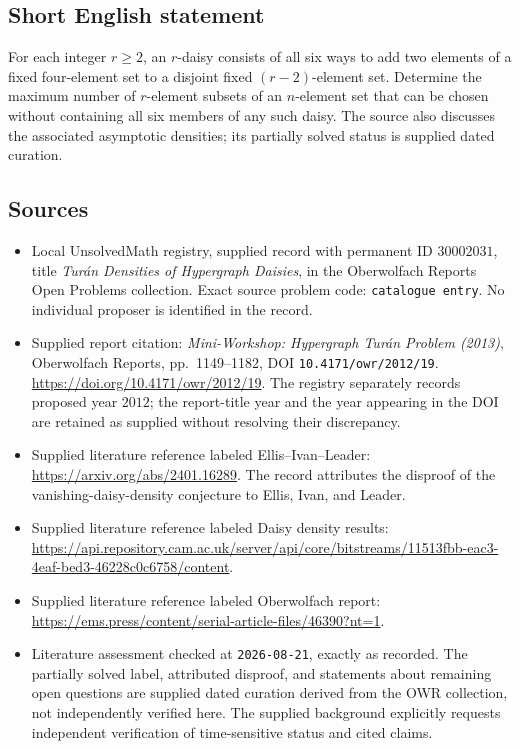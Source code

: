 \documentclass[11pt]{article}
\begin{document}
\subsection{Short English statement}
For each integer \(r\ge2\), an \(r\)-daisy consists of all six ways to add two elements of a fixed four-element set to a disjoint fixed \((r-2)\)-element set. Determine the maximum number of \(r\)-element subsets of an \(n\)-element set that can be chosen without containing all six members of any such daisy. The source also discusses the associated asymptotic densities; its partially solved status is supplied dated curation.
\subsection{Sources}
\begin{itemize}
\item Local UnsolvedMath registry, supplied record with permanent ID \(30002031\), title \emph{Turán Densities of Hypergraph Daisies}, in the Oberwolfach Reports Open Problems collection. Exact source problem code: \texttt{catalogue entry}. No individual proposer is identified in the record.
\item Supplied report citation: \emph{Mini-Workshop: Hypergraph Turán Problem (2013)}, Oberwolfach Reports, pp.\ 1149--1182, DOI \texttt{10.4171/owr/2012/19}. \url{https://doi.org/10.4171/owr/2012/19}. The registry separately records proposed year \(2012\); the report-title year and the year appearing in the DOI are retained as supplied without resolving their discrepancy.
\item Supplied literature reference labeled Ellis--Ivan--Leader: \url{https://arxiv.org/abs/2401.16289}. The record attributes the disproof of the vanishing-daisy-density conjecture to Ellis, Ivan, and Leader.
\item Supplied literature reference labeled Daisy density results: \url{https://api.repository.cam.ac.uk/server/api/core/bitstreams/11513fbb-eac3-4eaf-bed3-46228c0c6758/content}.
\item Supplied literature reference labeled Oberwolfach report: \url{https://ems.press/content/serial-article-files/46390?nt=1}.
\item Literature assessment checked at \texttt{2026-08-21}, exactly as recorded. The partially solved label, attributed disproof, and statements about remaining open questions are supplied dated curation derived from the OWR collection, not independently verified here. The supplied background explicitly requests independent verification of time-sensitive status and cited claims.
\end{itemize}
\end{document}
